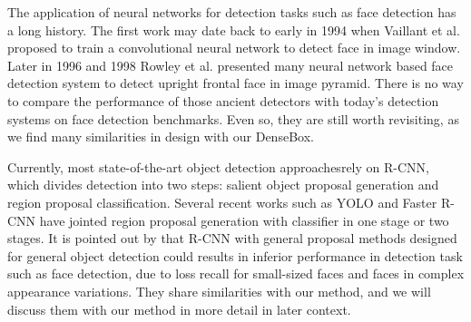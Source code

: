 
The application of neural networks for detection tasks such as face detection has a long history. The first work may date back to early in 1994 when Vaillant et al.\cite{vaillant1994original} proposed to train a convolutional neural network to detect face in image window.  Later in 1996 and 1998 Rowley et al.\cite{rowley1998neural,rowley1998rotation} presented many neural network based face detection system to detect upright frontal face in image pyramid. There is no way to compare the performance of those ancient detectors with today’s detection systems on face detection benchmarks. Even so, they are still worth revisiting, as we find many similarities in design with our DenseBox. 

Currently, most state-of-the-art object detection approaches\cite{ouyang2014deepid, li2015convolutional, erhan2014scalable,girshick2015fast}rely on R-CNN, which divides detection into two steps: salient object proposal generation and region proposal classification. Several recent works such as YOLO and Faster R-CNN have jointed region proposal generation with classifier in one stage or two stages. It is pointed out by \cite{farfade2015multi} that R-CNN with general proposal methods designed for general object detection could results in inferior performance in detection task such as face detection, due to loss recall for small-sized faces and faces in complex appearance variations. They share similarities with our method, and we will discuss them with our method in more detail in later context.  

 
